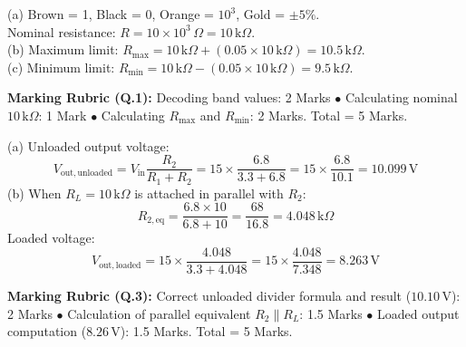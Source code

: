 \begin{solutionbox}[Solution to Q.1]
(a) Brown = 1, Black = 0, Orange = $10^3$, Gold = $\pm 5\%$.\\
Nominal resistance: $R = 10 \times 10^3\,\Omega = 10\,\mathrm{k}\Omega$.\\
(b) Maximum limit: $R_{\max} = 10\,\mathrm{k}\Omega + (0.05 \times 10\,\mathrm{k}\Omega) = 10.5\,\mathrm{k}\Omega$.\\
(c) Minimum limit: $R_{\min} = 10\,\mathrm{k}\Omega - (0.05 \times 10\,\mathrm{k}\Omega) = 9.5\,\mathrm{k}\Omega$.
\end{solutionbox}
\begin{markingrubric}
\textbf{Marking Rubric (Q.1):} Decoding band values: 2 Marks $\bullet$ Calculating nominal $10\,\mathrm{k}\Omega$: 1 Mark $\bullet$ Calculating $R_{\max}$ and $R_{\min}$: 2 Marks. Total = 5 Marks.
\end{markingrubric}

\begin{solutionbox}[Solution to Q.3]
(a) Unloaded output voltage:
\[ V_{\mathrm{out,unloaded}} = V_{\mathrm{in}} \frac{R_2}{R_1 + R_2} = 15 \times \frac{6.8}{3.3 + 6.8} = 15 \times \frac{6.8}{10.1} = 10.099\,\mathrm{V} \]
(b) When $R_L = 10\,\mathrm{k}\Omega$ is attached in parallel with $R_2$:
\[ R_{2,\mathrm{eq}} = \frac{6.8 \times 10}{6.8 + 10} = \frac{68}{16.8} = 4.048\,\mathrm{k}\Omega \]
Loaded voltage:
\[ V_{\mathrm{out,loaded}} = 15 \times \frac{4.048}{3.3 + 4.048} = 15 \times \frac{4.048}{7.348} = 8.263\,\mathrm{V} \]
\end{solutionbox}
\begin{markingrubric}
\textbf{Marking Rubric (Q.3):} Correct unloaded divider formula and result ($10.10\,\mathrm{V}$): 2 Marks $\bullet$ Calculation of parallel equivalent $R_2 \parallel R_L$: 1.5 Marks $\bullet$ Loaded output computation ($8.26\,\mathrm{V}$): 1.5 Marks. Total = 5 Marks.
\end{markingrubric}
\newpage
